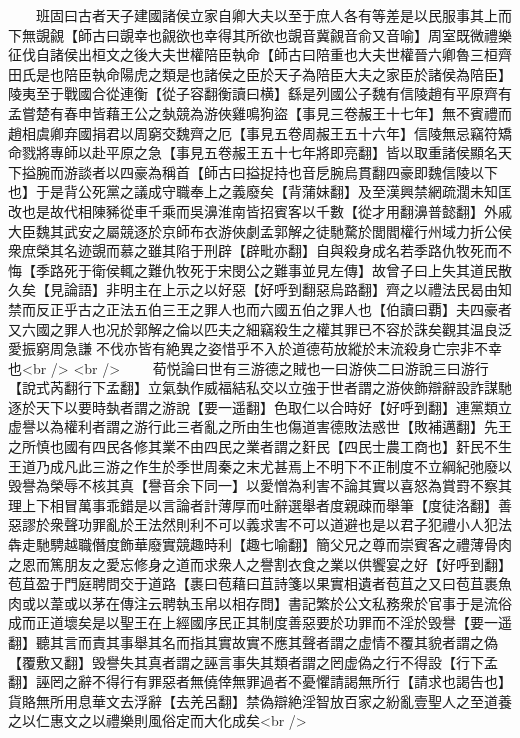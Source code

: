 　　班固曰古者天子建國諸侯立家自卿大夫以至于庶人各有等差是以民服事其上而下無覬覦【師古曰覬幸也覦欲也幸得其所欲也覬音冀覦音俞又音喻】周室既微禮樂征伐自諸侯出桓文之後大夫世權陪臣執命【師古曰陪重也大夫世權晉六卿魯三桓齊田氏是也陪臣執命陽虎之類是也諸侯之臣於天子為陪臣大夫之家臣於諸侯為陪臣】陵夷至于戰國合從連衡【從子容翻衡讀曰横】繇是列國公子魏有信陵趙有平原齊有孟嘗楚有春申皆藉王公之埶競為游俠雞鳴狗盜【事見三卷赧王十七年】無不賓禮而趙相虞卿弃國捐君以周窮交魏齊之厄【事見五卷周赧王五十六年】信陵無忌竊符矯命戮將專師以赴平原之急【事見五卷赧王五十七年將即亮翻】皆以取重諸侯顯名天下搤腕而游談者以四豪為稱首【師古曰搤捉持也音戹腕烏貫翻四豪即魏信陵以下也】于是背公死黨之議成守職奉上之義廢矣【背蒲妹翻】及至漢興禁網疏濶未知匡改也是故代相陳豨從車千乘而吳濞淮南皆招賓客以千數【從才用翻濞普懿翻】外戚大臣魏其武安之屬競逐於京師布衣游俠劇孟郭解之徒馳騖於閭閻權行州域力折公侯衆庶榮其名迹覬而慕之雖其陷于刑辟【辟毗亦翻】自與殺身成名若季路仇牧死而不悔【季路死于衛侯輒之難仇牧死于宋閔公之難事並見左傳】故曾子曰上失其道民散久矣【見論語】非明主在上示之以好惡【好呼到翻惡烏路翻】齊之以禮法民曷由知禁而反正乎古之正法五伯三王之罪人也而六國五伯之罪人也【伯讀曰覇】夫四豪者又六國之罪人也况於郭解之倫以匹夫之細竊殺生之權其罪已不容於誅矣觀其温良泛愛振窮周急謙不伐亦皆有絶異之姿惜乎不入於道德苟放縱於末流殺身亡宗非不幸也<br />
<br />
　　荀悦論曰世有三游德之賊也一曰游俠二曰游說三曰游行【說式芮翻行下孟翻】立氣埶作威福結私交以立強于世者謂之游俠飾辯辭設詐謀馳逐於天下以要時埶者謂之游說【要一遥翻】色取仁以合時好【好呼到翻】連黨類立虚譽以為權利者謂之游行此三者亂之所由生也傷道害德敗法惑世【敗補邁翻】先王之所慎也國有四民各修其業不由四民之業者謂之姧民【四民士農工商也】姧民不生王道乃成凡此三游之作生於季世周秦之末尤甚焉上不明下不正制度不立綱紀弛廢以毁譽為榮辱不核其真【譽音余下同一】以愛憎為利害不論其實以喜怒為賞罸不察其理上下相冒萬事乖錯是以言論者計薄厚而吐辭選舉者度親疎而舉筆【度徒洛翻】善惡謬於衆聲功罪亂於王法然則利不可以義求害不可以道避也是以君子犯禮小人犯法犇走馳騁越職僭度飾華廢實競趣時利【趣七喻翻】簡父兄之尊而崇賓客之禮薄骨肉之恩而篤朋友之愛忘修身之道而求衆人之譽割衣食之業以供饗宴之好【好呼到翻】苞苴盈于門庭聘問交于道路【裹曰苞藉曰苴詩箋以果實相遺者苞苴之又曰苞苴裹魚肉或以葦或以茅在傳注云聘執玉帛以相存問】書記繁於公文私務衆於官事于是流俗成而正道壞矣是以聖王在上經國序民正其制度善惡要於功罪而不淫於毁譽【要一遥翻】聽其言而責其事舉其名而指其實故實不應其聲者謂之虚情不覆其貌者謂之偽【覆敷又翻】毁譽失其真者謂之誣言事失其類者謂之罔虚偽之行不得設【行下孟翻】誣罔之辭不得行有罪惡者無僥倖無罪過者不憂懼請謁無所行【請求也謁告也】貨賂無所用息華文去浮辭【去羌呂翻】禁偽辯絶淫智放百家之紛亂壹聖人之至道養之以仁惠文之以禮樂則風俗定而大化成矣<br />

